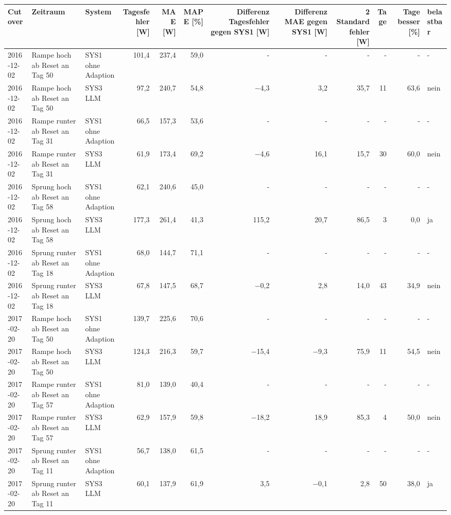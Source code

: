 \begin{tabular}{lllrrrrrrrrl}
\toprule
Cutover & Zeitraum & System & Tagesfehler [W] & MAE [W] & MAPE [\%] & Differenz Tagesfehler gegen SYS1 [W] & Differenz MAE gegen SYS1 [W] & 2 Standardfehler [W] & Tage & Tage besser [\%] & belastbar \\
\midrule
2016-12-02 & Rampe hoch ab Reset an Tag 50 & SYS1 ohne Adaption & 101,4 & 237,4 & 59,0 & - & - & - & - & - & - \\
2016-12-02 & Rampe hoch ab Reset an Tag 50 & SYS3 LLM & 97,2 & 240,7 & 54,8 & $-$4,3 & 3,2 & 35,7 & 11 & 63,6 & nein \\
2016-12-02 & Rampe runter ab Reset an Tag 31 & SYS1 ohne Adaption & 66,5 & 157,3 & 53,6 & - & - & - & - & - & - \\
2016-12-02 & Rampe runter ab Reset an Tag 31 & SYS3 LLM & 61,9 & 173,4 & 69,2 & $-$4,6 & 16,1 & 15,7 & 30 & 60,0 & nein \\
2016-12-02 & Sprung hoch ab Reset an Tag 58 & SYS1 ohne Adaption & 62,1 & 240,6 & 45,0 & - & - & - & - & - & - \\
2016-12-02 & Sprung hoch ab Reset an Tag 58 & SYS3 LLM & 177,3 & 261,4 & 41,3 & 115,2 & 20,7 & 86,5 & 3 & 0,0 & ja \\
2016-12-02 & Sprung runter ab Reset an Tag 18 & SYS1 ohne Adaption & 68,0 & 144,7 & 71,1 & - & - & - & - & - & - \\
2016-12-02 & Sprung runter ab Reset an Tag 18 & SYS3 LLM & 67,8 & 147,5 & 68,7 & $-$0,2 & 2,8 & 14,0 & 43 & 34,9 & nein \\
2017-02-20 & Rampe hoch ab Reset an Tag 50 & SYS1 ohne Adaption & 139,7 & 225,6 & 70,6 & - & - & - & - & - & - \\
2017-02-20 & Rampe hoch ab Reset an Tag 50 & SYS3 LLM & 124,3 & 216,3 & 59,7 & $-$15,4 & $-$9,3 & 75,9 & 11 & 54,5 & nein \\
2017-02-20 & Rampe runter ab Reset an Tag 57 & SYS1 ohne Adaption & 81,0 & 139,0 & 40,4 & - & - & - & - & - & - \\
2017-02-20 & Rampe runter ab Reset an Tag 57 & SYS3 LLM & 62,9 & 157,9 & 59,8 & $-$18,2 & 18,9 & 85,3 & 4 & 50,0 & nein \\
2017-02-20 & Sprung runter ab Reset an Tag 11 & SYS1 ohne Adaption & 56,7 & 138,0 & 61,5 & - & - & - & - & - & - \\
2017-02-20 & Sprung runter ab Reset an Tag 11 & SYS3 LLM & 60,1 & 137,9 & 61,9 & 3,5 & $-$0,1 & 2,8 & 50 & 38,0 & ja \\
\bottomrule
\end{tabular}
